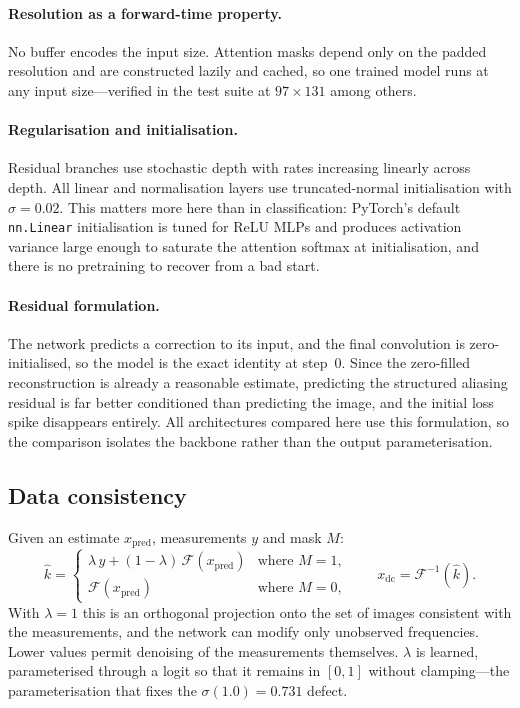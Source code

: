 \documentclass[11pt]{article}
\newcommand{\code}[1]{\texttt{\small #1}}
\begin{document}
\paragraph{Resolution as a forward-time property.} No buffer encodes the input
size. Attention masks depend only on the padded resolution and are constructed
lazily and cached, so one trained model runs at any input size---verified in the
test suite at $97\times131$ among others.

\paragraph{Regularisation and initialisation.} Residual branches use stochastic
depth with rates increasing linearly across depth. All linear and normalisation
layers use truncated-normal initialisation with $\sigma = 0.02$. This matters
more here than in classification: PyTorch's default \code{nn.Linear}
initialisation is tuned for ReLU MLPs and produces activation variance large
enough to saturate the attention softmax at initialisation, and there is no
pretraining to recover from a bad start.

\paragraph{Residual formulation.} The network predicts a correction to its
input, and the final convolution is zero-initialised, so the model is the exact
identity at step~0. Since the zero-filled reconstruction is already a reasonable
estimate, predicting the structured aliasing residual is far better conditioned
than predicting the image, and the initial loss spike disappears entirely. All
architectures compared here use this formulation, so the comparison isolates the
backbone rather than the output parameterisation.

\subsection{Data consistency}
\label{sec:dc}

Given an estimate $x_{\text{pred}}$, measurements $y$ and mask $M$:
\begin{equation}
\hat{k} = \begin{cases}
\lambda\, y + (1-\lambda)\,\mathcal{F}(x_{\text{pred}}) & \text{where } M = 1,\\[2pt]
\mathcal{F}(x_{\text{pred}}) & \text{where } M = 0,
\end{cases}
\qquad
x_{\text{dc}} = \mathcal{F}^{-1}(\hat{k}).
\end{equation}
With $\lambda = 1$ this is an orthogonal projection onto the set of images
consistent with the measurements, and the network can modify only unobserved
frequencies. Lower values permit denoising of the measurements themselves.
$\lambda$ is learned, parameterised through a logit so that it remains in
$[0,1]$ without clamping---the parameterisation that fixes the
$\sigma(1.0) = 0.731$ defect.
\end{document}
